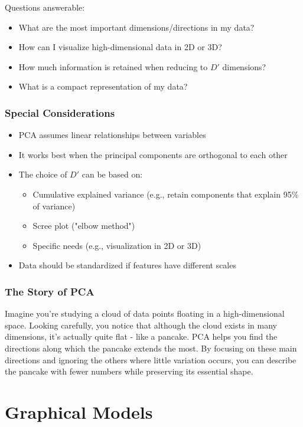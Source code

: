 \documentclass{article}
\begin{document}
Questions answerable:
\begin{itemize}
    \item What are the most important dimensions/directions in my data?
    \item How can I visualize high-dimensional data in 2D or 3D?
    \item How much information is retained when reducing to $D'$ dimensions?
    \item What is a compact representation of my data?
\end{itemize}

\subsubsection{Special Considerations}
\begin{itemize}
    \item PCA assumes linear relationships between variables
    \item It works best when the principal components are orthogonal to each other
    \item The choice of $D'$ can be based on:
    \begin{itemize}
        \item Cumulative explained variance (e.g., retain components that explain 95\% of variance)
        \item Scree plot ("elbow method")
        \item Specific needs (e.g., visualization in 2D or 3D)
    \end{itemize}
    \item Data should be standardized if features have different scales
\end{itemize}

\subsubsection{The Story of PCA}
Imagine you're studying a cloud of data points floating in a high-dimensional space. Looking carefully, you notice that although the cloud exists in many dimensions, it's actually quite flat - like a pancake. PCA helps you find the directions along which the pancake extends the most. By focusing on these main directions and ignoring the others where little variation occurs, you can describe the pancake with fewer numbers while preserving its essential shape.

\section{Graphical Models}
\end{document}
